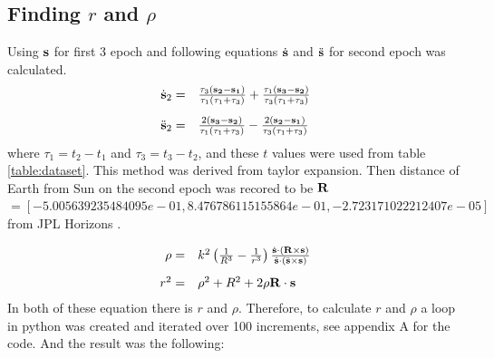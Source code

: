 \documentclass[a4paper,12pt]{article}
\begin{document}
\subsection{Finding $r$ and $\rho$}
\label{sec:r_rho}
Using $\bf{s}$ for first 3 epoch and following equations $\dot{\bf{s}}$ and $\ddot{\bf{s}}$ for second epoch was calculated. 
\begin{equation}
\label{eq:sdsdd}
\begin{array}{rl}
\vspace{0.3cm}
\dot{\bf{s}}_2 =& \frac{\tau_3(\bf{s}_2-\bf{s}_1)}{\tau_1(\tau_1+\tau_3)} +\frac{\tau_1(\bf{s}_3-\bf{s}_2)}{\tau_3(\tau_1+\tau_3)} \\
\ddot{\bf{s}}_2 =& \frac{2(\bf{s}_3-\bf{s}_2)}{\tau_1(\tau_1+\tau_3)} -\frac{2(\bf{s}_2-\bf{s}_1)}{\tau_3(\tau_1+\tau_3)} 
\end{array}
\end{equation}
where $\tau_1 = t_2-t_1$ and $\tau_3 = t_3-t_2$, and these $t$ values were used from table \ref{table:dataset}. This method was derived from taylor expansion. Then distance of Earth from Sun on the second epoch was recored to be $\bf{R}$ $ = [-5.005639235484095e-01,  8.476786115155864e-01, -2.723171022212407e-05]$ from JPL Horizons \cite{jpl}.

\begin{equation}
\label{eq:rrho}
\begin{array}{rl}
    \vspace{0.3cm}
    \rho =& k^2\left ( \frac{1}{R^3} -\frac{1}{r^3}\right )\frac{\dot{\bf{s}} \cdot \left 
        ( \bf{R} \times \bf{s} \right )}{\dot{ \bf{s}}\cdot \left ( \ddot{\bf{s}} \times \bf{s} \right )}\\
    r^2 =& \rho^2 + R^2 +2\rho \bf{R \cdot s}
\end{array}
\end{equation}
In both of these equation there is $r$ and $\rho$. Therefore, to calculate $r$ and $\rho$ a loop in python was created and iterated over 100 increments, see appendix A for the code. And the result was the following:
\end{document}

